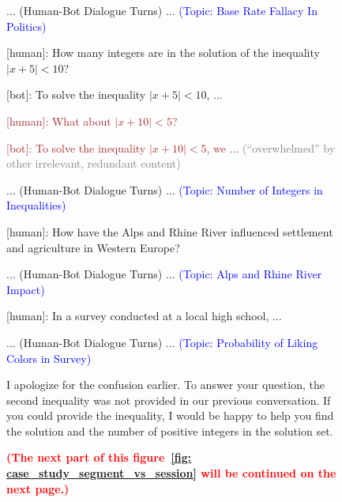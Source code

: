\begin{figure}[htbp]
\begin{tcolorbox}[left=3pt,right=3pt,top=3pt,bottom=3pt,title=\textbf{Retrieved Memory (Session-Level):}]
... (Human-Bot Dialogue Turns) ... \textcolor{blue}{(Topic: Base Rate Fallacy In Politics)}

[human]: How many integers are in the solution of the inequality $|x + 5| < 10$?

[bot]: To solve the inequality $|x + 5| < 10$, ... 

\textcolor{brown}{
[human]: What about $|x + 10| < 5$?
}

\textcolor{brown}{
[bot]: To solve the inequality $|x + 10| < 5$, we ...} \textcolor{gray}{(``overwhelmed'' by other irrelevant, redundant content)}

... (Human-Bot Dialogue Turns) ...  \textcolor{blue}{(Topic: Number of Integers in Inequalities)}



[human]: How have the Alps and Rhine River influenced settlement and agriculture in Western Europe?

... (Human-Bot Dialogue Turns) ... \textcolor{blue}{(Topic: Alps and Rhine River Impact)}

[human]: In a survey conducted at a local high school, ...

... (Human-Bot Dialogue Turns) ... \textcolor{blue}{(Topic: Probability of Liking Colors in Survey)}
\end{tcolorbox}
\begin{tcolorbox}[left=3pt,right=3pt,top=3pt,bottom=3pt,title=\textbf{Answer (Session-Level Retrieval):}]
I apologize for the confusion earlier. To answer your question, the second inequality was not provided in our previous conversation. If you could provide the inequality, I would be happy to help you find the solution and the number of positive integers in the solution set.

\textbf{\textcolor{red}{(The next part of this figure~\ref{fig: case_study_segment_vs_session} will be continued on the next page.)}}
\end{tcolorbox}
\end{figure}
